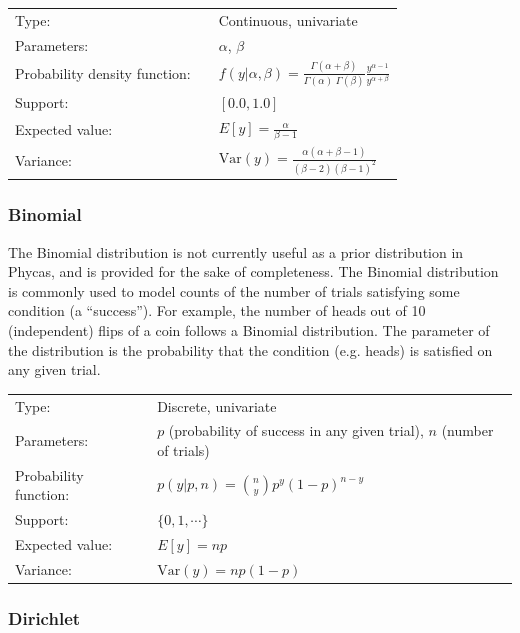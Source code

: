 \documentclass[10pt]{article}
\newcommand{\Var}{\mbox{Var}}
\begin{document}
\begin{tabular}{lcl}
Type:                 & & Continuous, univariate \\
Parameters:           & & $\alpha$, $\beta$   \\
Probability density function: & & $f(y|\alpha, \beta) = \frac{\Gamma(\alpha + \beta)}{\Gamma(\alpha) \; \Gamma(\beta)} \frac{y^{\alpha-1}}{y^{\alpha + \beta}}$ \\
Support:              & & $[0.0,1.0]$     \\
Expected value:       & & $E[y] = \frac{\alpha}{\beta - 1}$ \\
Variance:             & & $\Var(y) = \frac{\alpha (\alpha + \beta - 1)}{(\beta - 2)(\beta - 1)^2}$
\end{tabular}

\subsubsection{Binomial}

The Binomial distribution is not currently useful as a prior distribution in Phycas, and is provided for the sake of completeness. The Binomial distribution is commonly used to model counts of the number of trials satisfying some condition (a ``success''). For example, the number of heads out of 10 (independent) flips of a coin follows a Binomial distribution. The parameter of the distribution is the probability that the condition (e.g. heads) is satisfied on any given trial.

\begin{tabular}{lcl}
Type:                 & & Discrete, univariate \\
Parameters:           & & $p$ (probability of success in any given trial), $n$ (number of trials)    \\
Probability function: & & $p(y|p,n) = {n \choose y} p^y (1-p)^{n-y} $ \\
Support:              & & $\{0,1,\cdots\}$     \\
Expected value:       & & $E[y] = n p$ \\
Variance:             & & $\Var(y) = n p(1-p)$ 
\end{tabular}

\subsubsection{Dirichlet}
\end{document}
